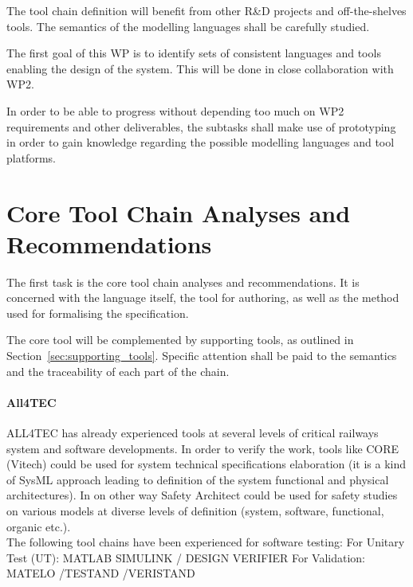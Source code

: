 \documentclass[11pt, a4paper]{article}
\begin{document}
The tool chain definition will benefit from other R\&D projects and off-the-shelves tools. The semantics of the modelling languages shall be carefully studied.

The first goal of this WP is to identify sets of consistent languages and tools enabling the design of the system.  This will be done in close collaboration with WP2.

In order to be able to progress without depending too much on WP2 requirements and other deliverables, the subtasks shall make use of prototyping in order to gain knowledge regarding the possible modelling languages and tool platforms.  
\section{Core Tool Chain Analyses and Recommendations}
\label{sec:core_tool}
The first task is the core tool chain analyses and recommendations. It is concerned with the language itself, the tool for authoring, as well as the method used for formalising the specification.

The core tool will be complemented by supporting tools, as outlined in Section~\ref{sec:supporting_tools}.
Specific attention shall be paid to the semantics and the traceability of each part of the chain.
\paragraph{All4TEC}
ALL4TEC has already experienced tools at several levels of critical railways system and software developments. 
In order to verify the work, tools like CORE (Vitech) could be used for system technical specifications elaboration (it is a kind of SysML approach leading to definition of the system functional and physical architectures).
In on other way Safety Architect could be used for safety studies on various
models at diverse levels of definition (system, software, functional, organic
etc.).\\
The following tool chains have been experienced for software testing: 
For Unitary Test (UT): MATLAB SIMULINK / DESIGN VERIFIER
For Validation: MATELO /TESTAND /VERISTAND

\end{document}

